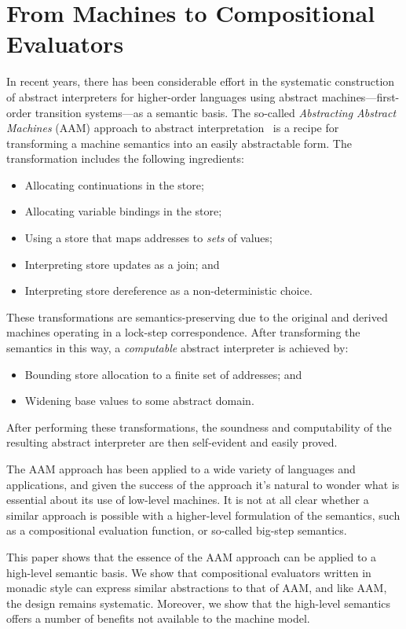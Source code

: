 \section{From Machines to Compositional Evaluators}
\label{s:aam}

In recent years, there has been considerable effort in the systematic
construction of abstract interpreters for higher-order languages using abstract
machines---first-order transition systems---as a semantic basis.  The so-called
\emph{Abstracting Abstract Machines} (AAM) approach to abstract
interpretation~\cite{dvanhorn:VanHorn2010Abstracting} is a recipe for
transforming a machine semantics into an easily abstractable form. The
transformation includes the following ingredients:
\begin{itemize}
\item Allocating continuations in the store;
\item Allocating variable bindings in the store;
\item Using a store that maps addresses to \emph{sets} of values;
\item Interpreting store updates as a join; and
\item Interpreting store dereference as a non-deterministic choice.
\end{itemize}
These transformations are semantics-preserving due to the original and derived
machines operating in a lock-step correspondence.  After transforming the
semantics in this way, a \emph{computable} abstract interpreter is achieved by:
\begin{itemize}
\item Bounding store allocation to a finite set of addresses; and
\item Widening base values to some abstract domain.
\end{itemize}
After performing these transformations, the soundness and computability of the
resulting abstract interpreter are then self-evident and easily proved.

The AAM approach has been applied to a wide variety of languages and
applications, and given the success of the approach it's natural to wonder what
is essential about its use of low-level machines. It is not at all clear
whether a similar approach is possible with a higher-level formulation of the
semantics, such as a compositional evaluation function, or so-called big-step
semantics.

This paper shows that the essence of the AAM approach can be applied to a
high-level semantic basis.  We show that compositional evaluators written in
monadic style can express similar abstractions to that of AAM, and like AAM,
the design remains systematic.  Moreover, we show that the high-level semantics
offers a number of benefits not available to the machine model.  

